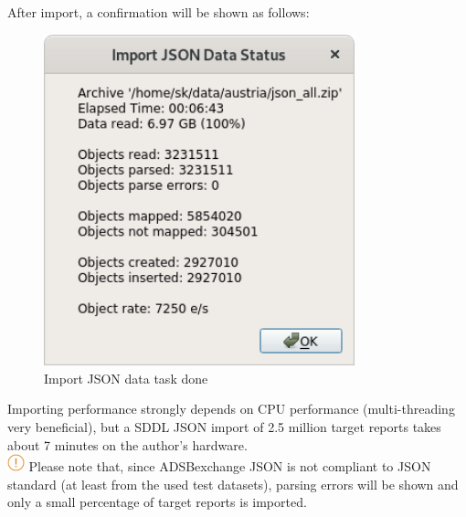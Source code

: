 After import, a confirmation will be shown as follows:

\begin{figure}[H]
  \center
    \includegraphics[width=9cm,frame]{../screenshots/json_import_done.png}
  \caption{Import JSON data task done}
\end{figure}

Importing performance strongly depends on CPU performance (multi-threading very beneficial), but a SDDL JSON import of 2.5 million target reports takes about 7 minutes on the author's hardware. \\

\includegraphics[width=0.5cm]{../../data/icons/hint.png} Please note that, since ADSBexchange JSON is not compliant to JSON standard (at least from the used test datasets), parsing errors will be shown and only a small percentage of target reports is imported.
